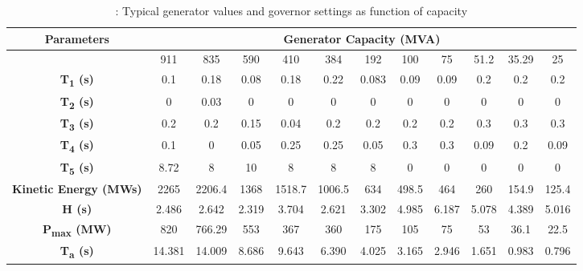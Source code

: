 \begin{table}[h]
	\caption{\label{tb:timeconstant}: Typical generator values and governor settings as function of capacity \cite{Anderson.2002}}
	\begin{adjustbox}{width=\textwidth, center}
		
		\begin{tabular}{cccccccccccc}
			\toprule
			\textbf{Parameters}    & \multicolumn{11}{c}{\textbf{Generator Capacity (MVA)}} \\
			
			\midrule
			{} & 911&    835&    590&    410&    384&    192&    100&    75&    51.2&    35.29&    25 \\
			\midrule
			
			\textbf{T\textsubscript{1} (s)}&    0.1&    0.18&    0.08&    0.18&    0.22&    0.083&    0.09&    0.09&    0.2&    0.2&    0.2\\
			\textbf{T\textsubscript{2} (s)}&    0&    0.03&    0&    0&    0&    0&    0&    0&    0&    0&    0\\
			\textbf{T\textsubscript{3} (s)}&    0.2&    0.2&    0.15&    0.04&    0.2&    0.2&    0.2&    0.2&    0.3&    0.3&    0.3\\
			\textbf{T\textsubscript{4} (s)}&    0.1&    0&    0.05&    0.25&    0.25&    0.05&    0.3&    0.3&    0.09&    0.2&    0.09\\
			\textbf{T\textsubscript{5} (s)}&    8.72&    8&    10&    8&    8&    8&    0&    0&    0&    0&    0\\
			\textbf{Kinetic Energy (MWs)}&    2265&    2206.4&    1368&    1518.7&    1006.5&    634    &498.5&    464&    260&    154.9&    125.4\\
			\textbf{H (s)}&    2.486&    2.642&    2.319&    3.704&    2.621&    3.302&    4.985&    6.187&    5.078&    4.389&    5.016\\
			\textbf{P\textsubscript{max} (MW)}&    820&    766.29&    553&    367&    360&    175&    105&    75&    53&    36.1&    22.5\\
			\textbf{T\textsubscript{a} (s)}&    14.381&    14.009&    8.686&    9.643&    6.390&    4.025&    3.165&    2.946&    1.651&    0.983&    0.796\\
			\bottomrule
		\end{tabular}
	\end{adjustbox}
\end{table}






